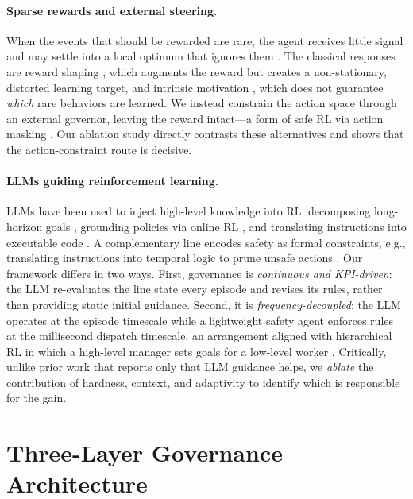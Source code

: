 \documentclass[letterpaper]{article} %
\begin{document}
\paragraph{Sparse rewards and external steering.}
When the events that should be rewarded are rare, the agent receives little
signal and may settle into a local optimum that ignores them \citep{pathak2017}.
The classical responses are reward shaping \citep{ng1999}, which augments the
reward but creates a non-stationary, distorted learning target, and intrinsic
motivation \citep{pathak2017}, which does not guarantee \emph{which} rare
behaviors are learned. We instead constrain the action space through an external
governor, leaving the reward intact---a form of safe RL via action masking
\citep{garcia2015}. Our ablation study directly contrasts these alternatives and
shows that the action-constraint route is decisive.

\paragraph{LLMs guiding reinforcement learning.}
LLMs have been used to inject high-level knowledge into RL: decomposing
long-horizon goals \citep{du2023}, grounding policies via online RL
\citep{carta2023}, and translating instructions into executable code
\citep{liang2023}. A complementary line encodes safety as formal constraints,
e.g., translating instructions into temporal logic to prune unsafe actions
\citep{hasanbeig2020}. Our framework differs in two ways. First, governance is
\emph{continuous and KPI-driven}: the LLM re-evaluates the line state every
episode and revises its rules, rather than providing static initial guidance.
Second, it is \emph{frequency-decoupled}: the LLM operates at the episode
timescale while a lightweight safety agent enforces rules at the millisecond
dispatch timescale, an arrangement aligned with hierarchical RL in which a
high-level manager sets goals for a low-level worker \citep{vezhnevets2017}.
Critically, unlike prior work that reports only that LLM guidance helps, we
\emph{ablate} the contribution of hardness, context, and adaptivity to identify
which is responsible for the gain.

\section{Three-Layer Governance Architecture}
\label{sec:arch}
\end{document}
